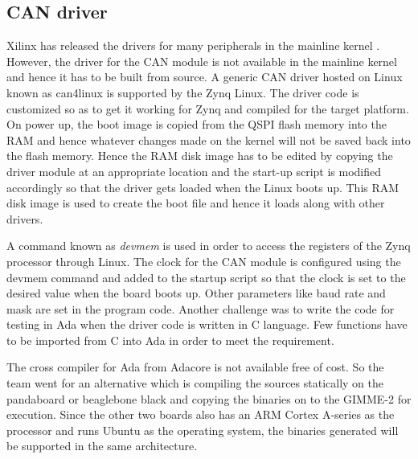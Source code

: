 \subsection{CAN driver}
Xilinx has released the drivers for many peripherals in the mainline kernel \cite{XilDrivers}. However, the driver for the CAN module is not available in the mainline kernel and hence it has to be built from source. A generic CAN driver hosted on Linux known as can4linux \cite{can4linux} is supported by the Zynq Linux. The driver code is customized so as to get it working for Zynq and compiled for the target platform. On power up, the boot image is copied from the QSPI flash memory into the RAM and hence whatever changes made on the kernel will not be saved back into the flash memory. Hence the RAM disk image has to be edited by copying the driver module at an appropriate location and the start-up script is modified accordingly so that the driver gets loaded when the Linux boots up. This RAM disk image is used to create the boot file and hence it loads along with other drivers. 

A command known as \textit{devmem} is used in order to access the registers of the Zynq processor through Linux. The clock for the CAN module is configured using the devmem command and added to the startup script so that the clock is set to the desired value when the board boots up. Other parameters like baud rate and mask are set in the program code. Another challenge was to write the code for testing in Ada when the driver code is written in C language. Few functions have to be imported from C into Ada in order to meet the requirement.

The cross compiler for Ada from Adacore is not available free of cost. So the team went for an alternative which is compiling the sources statically on the pandaboard or beaglebone black and copying the binaries on to the GIMME-2 for execution. Since the other two boards also has an ARM Cortex A-series as the processor and runs Ubuntu as the operating system, the binaries generated will be supported in the same architecture. 

%
